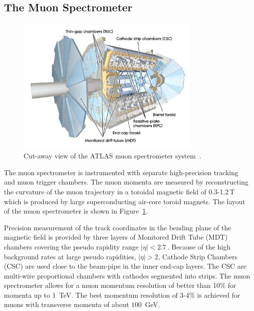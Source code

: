 \subsection{The Muon Spectrometer}
\begin{figure}[tp]
     \begin{center}

            \includegraphics[width=0.8\textwidth]{figure/muonSpec.png}

    \end{center}
    \caption{Cut-away view of the ATLAS muon spectrometer system~\cite{ATLASDetector}.}



   \label{fig:atlasMu}
\end{figure}
The muon spectrometer is instrumented with separate high-precision tracking and muon trigger chambers. 
The muon momenta are measured  by reconstructing the  curvature of the muon trajectory in a
 toroidal magnetic field of 0.3-1.2\,T  which is  produced by large superconducting air-core toroid magnets.
The layout of the muon spectrometer is shown in Figure~\ref{fig:atlasMu}.

Precision measurement of the track coordinates in the bending plane of the 
magnetic field is provided by three layers of Monitored Drift Tube (MDT) chambers covering the pseudo rapidity range
 $|\eta| < 2.7\,.$ Because of the high background rates at large pseudo rapidities, 
$|\eta| > 2$, Cathode Strip Chambers (CSC) are used close to the beam-pipe in the inner end-cap layers. 
The CSC are multi-wire proportional chambers with cathodes segmented into strips. 
The muon spectrometer allows for a muon momentum resolution of better than 10\%  for momenta up to 1~TeV.
The best momentum resolution of 3-4\% is achieved for muons with transverse momenta of about $100$~GeV. 

